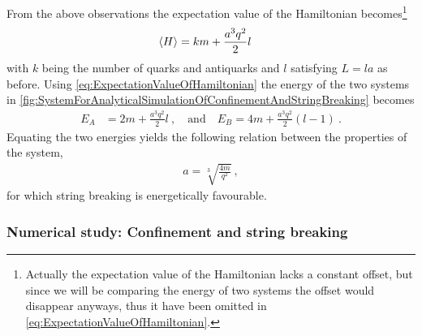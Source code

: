\documentclass[../main.tex]{subfiles} %
\begin{document}
From the above observations the expectation value of the Hamiltonian becomes\footnote{Actually the expectation value of the Hamiltonian lacks a constant offset, but since we will be comparing the energy of two systems the offset would disappear anyways, thus it have been omitted in \cref{eq:ExpectationValueOfHamiltonian}.}
\begin{align} \label{eq:ExpectationValueOfHamiltonian}
    \expval{H} &= km + \frac{a^3 q^2}{2}l
\end{align}
with $k$ being the number of quarks and antiquarks and $l$ satisfying $L=la$ as before. Using \cref{eq:ExpectationValueOfHamiltonian} the energy of the two systems in \cref{fig:SystemForAnalyticalSimulationOfConfinementAndStringBreaking} becomes
\begin{align}
    E_A &= 2m + \frac{a^3 q^2}{2}l \: ,
    \quad \text{and} \quad
    E_B = 4m + \frac{a^3 q^2}{2}(l-1) \: .
\end{align}
Equating the two energies yields the following relation between the properties of the system,
\begin{align} \label{eq:StringBreakingFavourableValues}
    a = \sqrt[3\:\:\,]{\frac{4m}{q^2}} \: ,
\end{align}
for which string breaking is energetically favourable.



\subsubsection{Numerical study: Confinement and string breaking}
\end{document}
